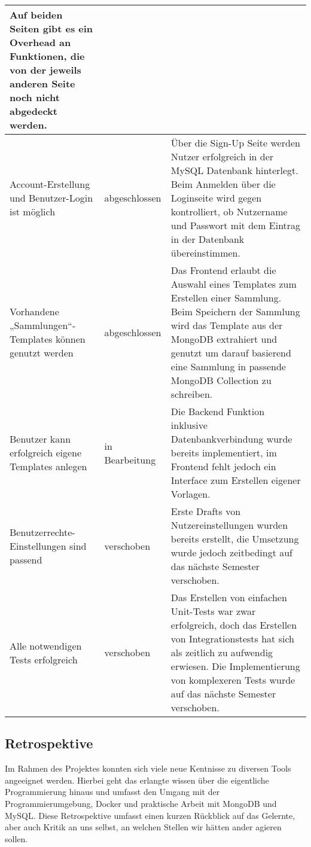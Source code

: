 \begin{table}[h]
\begin{tabular}{|p{}|p{}|p{}|}
        Auf beiden Seiten gibt es ein Overhead an Funktionen, die von der jeweils anderen Seite noch nicht abgedeckt werden. \\
        \hline
        Account-Erstellung und Benutzer-Login ist möglich & \cellcolor{green}abgeschlossen &  Über die Sign-Up Seite werden Nutzer erfolgreich in der MySQL Datenbank hinterlegt.
        Beim Anmelden über die Loginseite wird gegen kontrolliert, ob Nutzername und Passwort mit dem Eintrag in der Datenbank übereinstimmen.
        \\
        \hline
        Vorhandene „Sammlungen“-Templates können genutzt werden & \cellcolor{green}abgeschlossen & Das Frontend erlaubt die Auswahl eines Templates zum Erstellen einer Sammlung.
        Beim Speichern der Sammlung wird das Template aus der MongoDB extrahiert und genutzt um darauf basierend eine Sammlung in passende MongoDB Collection zu schreiben.
        \\
        \hline
        Benutzer kann erfolgreich eigene Templates anlegen & \cellcolor{orange}in Bearbeitung & Die Backend Funktion inklusive Datenbankverbindung wurde bereits implementiert, im Frontend fehlt jedoch ein Interface zum Erstellen eigener Vorlagen. \\
        \hline
        Benutzerrechte-Einstellungen sind passend & \cellcolor{red}verschoben & Erste Drafts von Nutzereinstellungen wurden bereits erstellt, die Umsetzung wurde jedoch zeitbedingt auf das nächste Semester verschoben. \\
        \hline
        Alle notwendigen Tests erfolgreich & \cellcolor{red}verschoben & Das Erstellen von einfachen Unit-Tests war zwar erfolgreich, doch das Erstellen von Integrationstests hat sich als zeitlich zu aufwendig erwiesen.
        Die Implementierung von komplexeren Tests wurde auf das nächste Semester verschoben. \\
        \hline
    \end{tabular}
    \label{tab:definition-of-done-vergleich}
\end{table}

\subsection{Retrospektive}\label{subsec:retrospektive}

Im Rahmen des Projektes konnten sich viele neue Kentnisse zu diversen Tools angeeignet werden.
Hierbei geht das erlangte wissen über die eigentliche Programmierung hinaus und umfasst den Umgang mit der Programmierumgebung, Docker und praktische Arbeit mit MongoDB und MySQL.
Diese Retrospektive umfasst einen kurzen Rückblick auf das Gelernte, aber auch Kritik an uns selbst, an welchen Stellen wir hätten ander agieren sollen.

